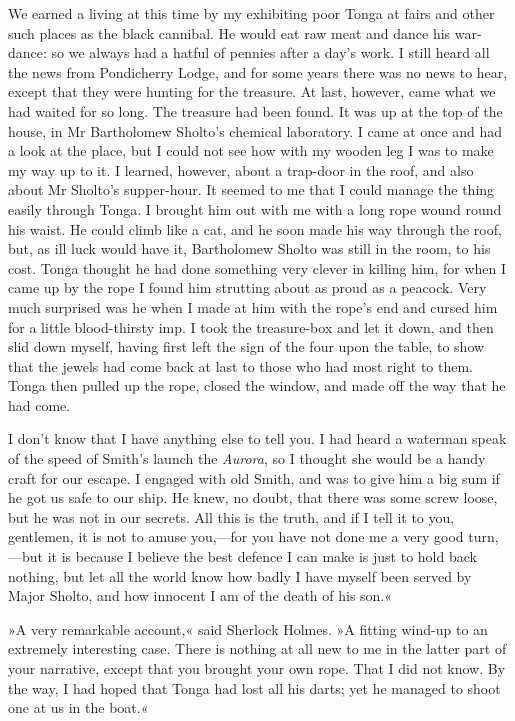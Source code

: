We earned a living at this time by my exhibiting poor Tonga at fairs and other such places as the black cannibal. He would eat raw meat and dance his war-dance: so we always had a hatful of pennies after a day's work. I still heard all the news from Pondicherry Lodge, and for some years there was no news to hear, except that they were hunting for the treasure. At last, however, came what we had waited for so long. The treasure had been found. It was up at the top of the house, in Mr Bartholomew Sholto's chemical laboratory. I came at once and had a look at the place, but I could not see how with my wooden leg I was to make my way up to it. I learned, however, about a trap-door in the roof, and also about Mr Sholto's supper-hour. It seemed to me that I could manage the thing easily through Tonga. I brought him out with me with a long rope wound round his waist. He could climb like a cat, and he soon made his way through the roof, but, as ill luck would have it, Bartholomew Sholto was still in the room, to his cost. Tonga thought he had done something very clever in killing him, for when I came up by the rope I found him strutting about as proud as a peacock. Very much surprised was he when I made at him with the rope's end and cursed him for a little blood-thirsty imp. I took the treasure-box and let it down, and then slid down myself, having first left the sign of the four upon the table, to show that the jewels had come back at last to those who had most right to them. Tonga then pulled up the rope, closed the window, and made off the way that he had come.

I don't know that I have anything else to tell you. I had heard a waterman speak of the speed of Smith's launch the \textit{Aurora}, so I thought she would be a handy craft for our escape. I engaged with old Smith, and was to give him a big sum if he got us safe to our ship. He knew, no doubt, that there was some screw loose, but he was not in our secrets. All this is the truth, and if I tell it to you, gentlemen, it is not to amuse you,—for you have not done me a very good turn,—but it is because I believe the best defence I can make is just to hold back nothing, but let all the world know how badly I have myself been served by Major Sholto, and how innocent I am of the death of his son.«

»A very remarkable account,« said Sherlock Holmes. »A fitting wind-up to an extremely interesting case. There is nothing at all new to me in the latter part of your narrative, except that you brought your own rope. That I did not know. By the way, I had hoped that Tonga had lost all his darts; yet he managed to shoot one at us in the boat.«

